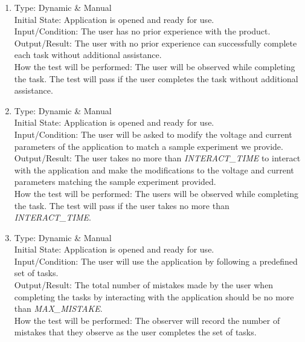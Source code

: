\documentclass[12pt, titlepage]{article}
\begin{document}
\begin{adjustwidth}{2.2em}{0pt}
\begin{enumerate}[{NF-UT}1.]
  \item Type: Dynamic \& Manual\\ \label{UT1}
  Initial State: Application is opened and ready for use.\\
  Input/Condition: The user has no prior experience with the product.\\
  Output/Result: The user with no prior experience can successfully complete each task without additional assistance.\\
  How the test will be performed: The user will be observed while completing the task. The test will pass if the user completes the task without additional assistance.

  \item Type: Dynamic \& Manual\\ \label{UT2}
  Initial State: Application is opened and ready for use.\\
  Input/Condition: The user will be asked to modify the voltage and current parameters of the application to match a sample experiment we provide.\\
  Output/Result: The user takes no more than \textsl{INTERACT\_TIME} to interact with the application and make the modifications to the voltage and current parameters matching the sample experiment provided.\\
  How the test will be performed: The users will be observed while completing the task. The test will pass if the user takes no more than \textsl{INTERACT\_TIME}.

  \item Type: Dynamic \& Manual \\ \label{UT3}
  Initial State: Application is opened and ready for use.\\
  Input/Condition: The user will use the application by following a predefined set of tasks.\\
  Output/Result: The total number of mistakes made by the user when completing the tasks by interacting with the application should be no more than \textsl{MAX\_MISTAKE}.\\
  How the test will be performed: The observer will record the number of mistakes that they observe as the user completes the set of tasks.


\end{enumerate}
\end{adjustwidth}
\end{document}
